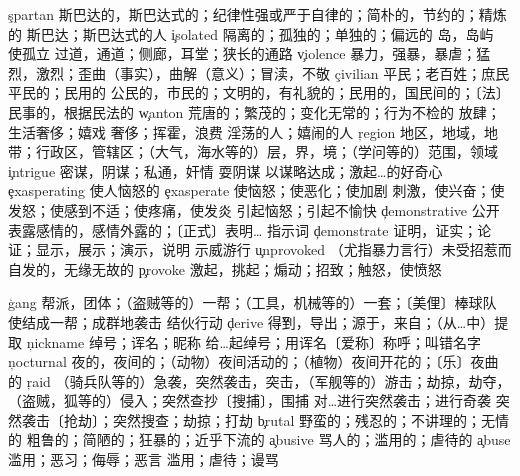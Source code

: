 \begin{multicols}{2}
\c{spartan}  \a 斯巴达的，斯巴达式的；纪律性强或严于自律的；简朴的，节约的；精炼的 \n 斯巴达；斯巴达式的人
\c{isolated}  \a 隔离的；孤独的；单独的；偏远的
  \n 岛，岛屿 \vt 使孤立
  \n 过道，通道；侧廊，耳堂；狭长的通路
\c{violence}  \n 暴力，强暴，暴虐；猛烈，激烈；歪曲（事实），曲解（意义）；冒渎，不敬
\c{civilian}  \n 平民；老百姓；庶民 \a 平民的；民用的
  \a 公民的，市民的；文明的，有礼貌的；民用的，国民间的；〔法〕民事的，根据民法的
\c{wanton}  \a 荒唐的；繁茂的；变化无常的；行为不检的 \vi 放肆；生活奢侈；嬉戏 \vt 奢侈；挥霍，浪费 \n 淫荡的人；嬉闹的人
\c{region}  \n 地区，地域，地带；行政区，管辖区；（大气，海水等的）层，界，境；（学问等的）范围，领域
\c{intrigue}  \n 密谋，阴谋；私通，奸情 \vi 耍阴谋 \vt 以谋略达成；激起…的好奇心
\c{exasperating}  \a 使人恼怒的
\c{exasperate}  \vt 使恼怒；使恶化；使加剧
  \vt 刺激，使兴奋；使发怒；使感到不适；使疼痛，使发炎 \vi 引起恼怒；引起不愉快
\c{demonstrative}  \a 公开表露感情的，感情外露的；〔正式〕表明… \n 指示词
\c{demonstrate}  \vt 证明，证实；论证；显示，展示；演示，说明 \vi 示威游行
\c{unprovoked}  \a （尤指暴力言行）未受招惹而自发的，无缘无故的
\c{provoke}  \vt 激起，挑起；煽动；招致；触怒，使愤怒

\c{gang}  \n 帮派，团体；（盗贼等的）一帮；（工具，机械等的）一套；〔美俚〕棒球队 \vt 使结成一帮；成群地袭击 \vi 结伙行动
\c{derive}  \v 得到，导出；源于，来自；（从…中）提取
\c{nickname}  \n 绰号；诨名；昵称 \vt 给…起绰号；用诨名〔爱称〕称呼；叫错名字
\c{nocturnal}  \a 夜的，夜间的；（动物）夜间活动的；（植物）夜间开花的；〔乐〕夜曲的
\c{raid}  \n （骑兵队等的）急袭，突然袭击，突击，（军舰等的）游击；劫掠，劫夺，（盗贼，狐等的）侵入；突然查抄〔搜捕〕，围捕 \vi 对…进行突然袭击；进行奇袭 \vt 突然袭击〔抢劫〕；突然搜查；劫掠；打劫 
\c{brutal}  \a 野蛮的；残忍的；不讲理的；无情的
  \a 粗鲁的；简陋的；狂暴的；近乎下流的
\c{abusive}  \a 骂人的；滥用的；虐待的
\c{abuse}  \n 滥用；恶习；侮辱；恶言 \vt 滥用；虐待；谩骂



\end{multicols}
